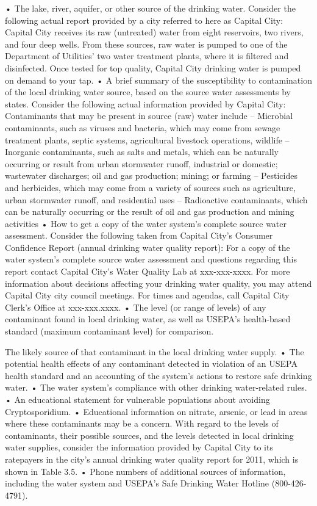 \documentclass{article}
\begin{document}
• The lake, river, aquifer, or other source of the drinking water.
Consider the following actual report provided by a city referred to here
as Capital City: Capital City receives its raw (untreated) water from
eight reservoirs, two rivers, and four deep wells. From these sources,
raw water is pumped to one of the Department of Utilities' two water
treatment plants, where it is filtered and disinfected. Once tested for
top quality, Capital City drinking water is pumped on demand to your
tap. • A brief summary of the susceptibility to contamination of the
local drinking water source, based on the source water assessments by
states. Consider the following actual information provided by Capital
City: Contaminants that may be present in source (raw) water include --
Microbial contaminants, such as viruses and bacteria, which may come
from sewage treatment plants, septic systems, agricultural livestock
operations, wildlife -- Inorganic contaminants, such as salts and
metals, which can be naturally occurring or result from urban stormwater
runoff, industrial or domestic; wastewater discharges; oil and gas
production; mining; or farming -- Pesticides and herbicides, which may
come from a variety of sources such as agriculture, urban stormwater
runoff, and residential uses -- Radioactive contaminants, which can be
naturally occurring or the result of oil and gas production and mining
activities • How to get a copy of the water system's complete source
water assessment. Consider the following taken from Capital City's
Consumer Confidence Report (annual drinking water quality report): For a
copy of the water system's complete source water assessment and
questions regarding this report contact Capital City's Water Quality Lab
at xxx-xxx-xxxx. For more information about decisions affecting your
drinking water quality, you may attend Capital City city council
meetings. For times and agendas, call Capital City Clerk's Office at
xxx-xxx.xxxx. • The level (or range of levels) of any contaminant found
in local drinking water, as well as USEPA's health-based standard
(maximum contaminant level) for comparison.

The likely source of that contaminant in the local drinking water
supply. • The potential health effects of any contaminant detected in
violation of an USEPA health standard and an accounting of the system's
actions to restore safe drinking water. • The water system's compliance
with other drinking water-related rules. • An educational statement for
vulnerable populations about avoiding Cryptosporidium. • Educational
information on nitrate, arsenic, or lead in areas where these
contaminants may be a concern. With regard to the levels of
contaminants, their possible sources, and the levels detected in local
drinking water supplies, consider the information provided by Capital
City to its ratepayers in the city's annual drinking water quality
report for 2011, which is shown in Table 3.5. • Phone numbers of
additional sources of information, including the water system and
USEPA's Safe Drinking Water Hotline (800-426-4791).
\end{document}
